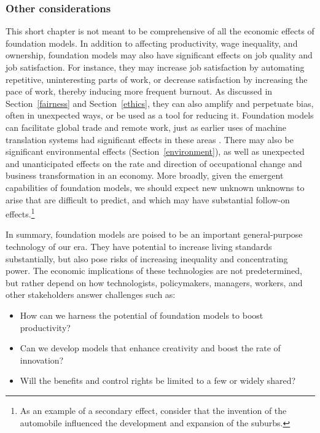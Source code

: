 \subsubsection{Other considerations} This short chapter is not meant to be comprehensive of all the economic effects of foundation models. In addition to affecting productivity, wage inequality, and ownership, foundation models may also have significant effects on job quality and job satisfaction. For instance, they may increase job satisfaction by automating repetitive, uninteresting parts of work, or decrease satisfaction by increasing the pace of work, thereby inducing more frequent burnout. As discussed in Section~\ref{fairness} and Section~\ref{ethics}, they can also amplify and perpetuate bias, often in unexpected ways, or be used as a tool for reducing it. Foundation models can facilitate global trade and remote work, just as earlier uses of machine translation systems had significant effects in these areas \citep[e.g. ][]{Brynjolfsson2019}. There may also be significant environmental effects (Section~\ref{environment}), as well as unexpected and unanticipated effects on the rate and direction of occupational change and business transformation in an economy. More broadly, given the emergent capabilities of foundation models, we should expect new unknown unknowns to arise that are difficult to predict, and which may have substantial follow-on effects.\footnote{As an example of a secondary effect, consider that the invention of the automobile influenced the development and expansion of the suburbs.}

In summary, foundation models are poised to be an important general-purpose technology of our era. They have potential to increase living standards substantially, but also pose risks of increasing inequality and concentrating power. The economic implications of these technologies are not predetermined, but rather depend on how technologists, policymakers, managers, workers, and other stakeholders answer challenges such as:

\begin{itemize} 
\item   How can we harness the potential of foundation models to boost productivity?
\item  	Can we develop models that enhance creativity and boost the rate of innovation?
\item   Will the benefits and control rights be limited to a few or widely shared?
\end{itemize}

